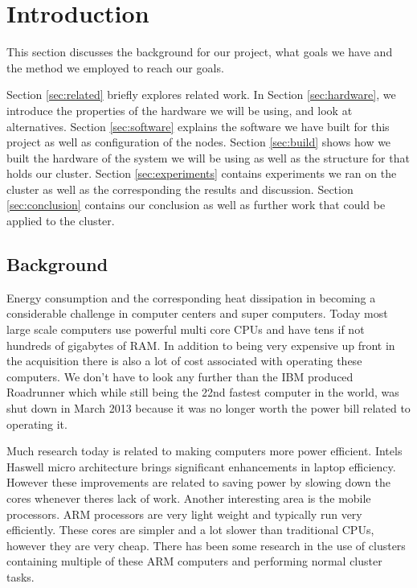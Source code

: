 \clearpage
\section{Introduction}
\label{sec:introduction}

This section discusses the background for our project, what goals we have and the method we employed to reach our goals.

Section \ref{sec:related} briefly explores related work.
In Section \ref{sec:hardware}, we introduce the properties of the hardware we will be using, and look at alternatives.
Section \ref{sec:software} explains the software we have built for this project as well as configuration of the nodes.
Section \ref{sec:build} shows how we built the hardware of the system we will be using as well as the structure for that holds our cluster.
Section \ref{sec:experiments} contains experiments we ran on the cluster as well as the corresponding the results and discussion.
Section \ref{sec:conclusion} contains our conclusion as well as further work that could be applied to the cluster.

\subsection{Background}
Energy consumption and the corresponding heat dissipation in becoming a considerable challenge in computer centers and super computers. Today most large scale computers use powerful multi core CPUs and have tens if not hundreds of gigabytes of RAM. In addition to being very expensive up front in the acquisition there is also a lot of cost associated with operating these computers. We don't have to look any further than the IBM produced Roadrunner which while still being the 22nd fastest computer in the world, was shut down in March 2013 because it was no longer worth the power bill related to operating it.\cite{roadrunner}

Much research today is related to making computers more power efficient. Intels Haswell micro architecture brings significant enhancements in laptop efficiency. However these improvements are related to saving power by slowing down the cores whenever theres lack of work. Another interesting area is the mobile processors. ARM processors are very light weight and typically run very efficiently. These cores are simpler and a lot slower than traditional CPUs, however they are very cheap. There has been some research in the use of clusters containing multiple of these ARM computers and performing normal cluster tasks.

